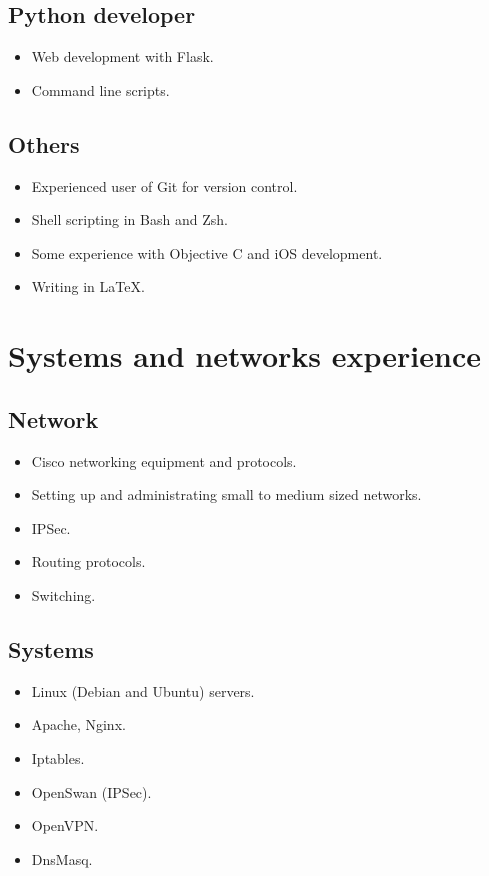 \documentclass[a4paper, 11pt]{article}
\begin{document}
        \subsection*{Python developer}
            \begin{itemize}
                \item Web development with Flask.
                \item Command line scripts.
            \end{itemize}

        \subsection*{Others}
            \begin{itemize}
                \item Experienced user of Git for version control.
                \item Shell scripting in Bash and Zsh.
                \item Some experience with Objective C and iOS development.
                \item Writing in \LaTeX.
            \end{itemize}


    \section*{Systems and networks experience}

        \subsection*{Network}
            \begin{itemize}
                \item Cisco networking equipment and protocols.
                \item Setting up and administrating small to medium sized networks.
                \item IPSec.
                \item Routing protocols.
                \item Switching.
            \end{itemize}

        \subsection*{Systems}
            \begin{itemize}
                \item Linux (Debian and Ubuntu) servers.
                \item Apache, Nginx.
                \item Iptables.
                \item OpenSwan (IPSec).
                \item OpenVPN.
                \item DnsMasq.
            \end{itemize}
\end{document}
